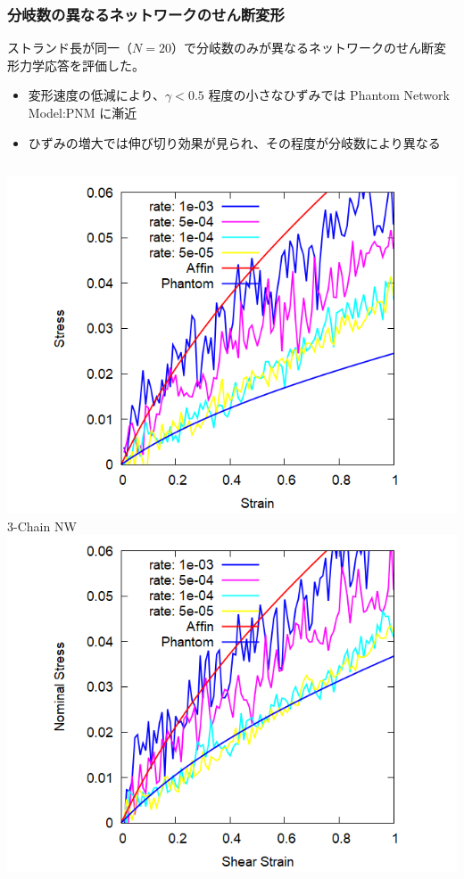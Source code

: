 \documentclass[12pt, dvipdfmx]{beamer}
\begin{document}
\begin{frame}
	\frametitle{分岐数の異なるネットワークのせん断変形}
	ストランド長が同一（$N=20$）で分岐数のみが異なるネットワークのせん断変形力学応答を評価した。\\

	\begin{itemize}
		\item 変形速度の低減により、$\gamma<0.5$ 程度の小さなひずみでは Phantom Network Model:PNM に漸近
		\item ひずみの増大では伸び切り効果が見られ、その程度が分岐数により異なる
	\end{itemize}

	\begin{columns}[T, onlytextwidth]
			\centering
			\includegraphics[width=\textwidth]{3chain_shear.png}
			3-Chain NW
		\centering
			\includegraphics[width=\textwidth]{4chain_shear.png}

\end{columns}
\end{frame}
\end{document}
